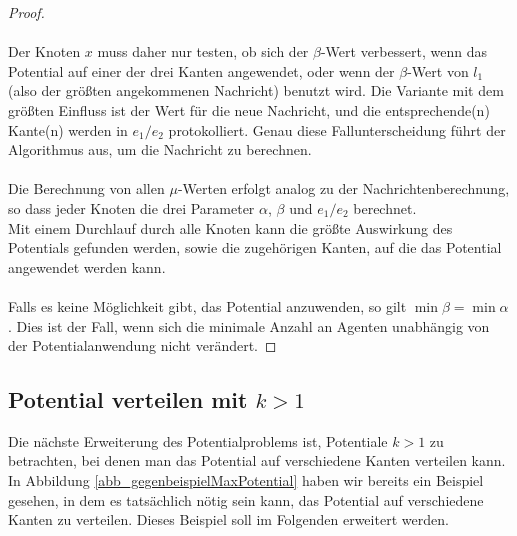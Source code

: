 \begin{proof}
		\\
		\\
		Der Knoten $x$ muss daher nur testen, ob sich der $\beta$-Wert verbessert, wenn das Potential auf einer der drei Kanten angewendet, oder wenn der $\beta$-Wert von $l_{1}$ (also der größten angekommenen Nachricht) benutzt wird. Die Variante mit dem größten Einfluss ist der Wert für die neue Nachricht, und die entsprechende(n) Kante(n) werden in $e_1/e_2$ protokolliert. Genau diese Fallunterscheidung führt der Algorithmus aus, um die Nachricht zu berechnen.
		\\
		\\
		Die Berechnung von allen $\mu$-Werten erfolgt analog zu der Nachrichtenberechnung, so dass jeder Knoten die drei Parameter $\alpha$, $\beta$ und $e_1/e_2$ berechnet. \\
		Mit einem Durchlauf durch alle Knoten kann die größte Auswirkung des Potentials gefunden werden, sowie die zugehörigen Kanten, auf die das Potential angewendet werden kann.
		\\
		\\
		Falls es keine Möglichkeit gibt, das Potential anzuwenden, so gilt $\min \beta = \min \alpha$. Dies ist der Fall, wenn sich die minimale Anzahl an Agenten unabhängig von der Potentialanwendung nicht verändert.
	\end{proof}
	
	

\subsection{Potential verteilen mit $k > 1$}\label{kap_pot>1_verteilt}

Die nächste Erweiterung des Potentialproblems ist, Potentiale $k > 1$ zu betrachten, bei denen man das Potential auf verschiedene Kanten verteilen kann.\\
In Abbildung \ref{abb_gegenbeispielMaxPotential} haben wir bereits ein Beispiel gesehen, in dem es tatsächlich nötig sein kann, das Potential auf verschiedene Kanten zu verteilen. Dieses Beispiel soll im Folgenden erweitert werden.

